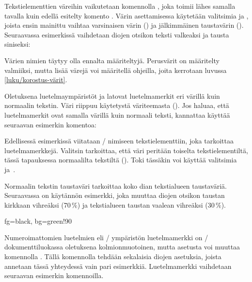 Tekstielementtien väreihin vaikutetaan komennolla
, joka toimii lähes samalla tavalla kuin edellä
esitelty komento . Värin asettamisessa käytetään
valitsimia  ja , joista ensin mainittu vaihtaa
varsinaisen värin () ja jälkimmäinen taustavärin
(). Seuraavassa esimerkissä vaihdetaan diojen
otsikon teksti valkeaksi ja tausta siniseksi:

\begin{koodilohkosis}
\end{koodilohkosis}

\noindent
Värien nimien täytyy olla ennalta määriteltyjä. Perusvärit on määritelty
valmiiksi, mutta lisää värejä voi määritellä ohjeilla, joita kerrotaan
luvussa \ref{luku/korostus-värit}.

Oletuksena luetelmaympäristöt  ja
 latovat luetelmamerkit eri värillä kuin normaalin
tekstin. Väri riippuu käytetystä väriteemasta ().
Jos haluaa, että luetelmamerkit ovat samalla värillä kuin normaali
teksti, kannattaa käyttää seuraavan esimerkin komentoa:

\begin{koodilohkosis}
\end{koodilohkosis}

\noindent
Edellisessä esimerkissä viitataan \-/ nimiseen
tekstielementtiin, joka tarkoittaa luetelmamerkkejä. Valitsin
 tarkoittaa, että väri peritään toiselta
tekstielementiltä, tässä tapauksessa normaalilta tekstiltä
(). Toki tässäkin voi käyttää valitsimia
 ja~.

Normaalin tekstin taustaväri tarkoittaa koko dian tekstialueen
taustaväriä. Seuraavassa on käytännön esimerkki, joka muuttaa diojen
otsikon taustan kirkkaan vihreäksi (70\,\%) ja tekstialueen taustan
vaalean vihreäksi (30\,\%).

\begin{koodilohkosis}
 {fg=black, bg=green!90}
\end{koodilohkosis}

\noindent
Numeroimattomien luetelmien eli \-/ ympäristön
luetelmamerkki on \-/ dokumenttiluokassa oletuksena
kolmionmuotoinen, mutta asetusta voi muuttaa komennolla
. Tällä komennolla tehdään sekalaisia diojen
asetuksia, joista annetaan tässä yhteydessä vain pari esimerkkiä.
Luetelmamerkki vaihdetaan seuraavan esimerkin komennoilla.

